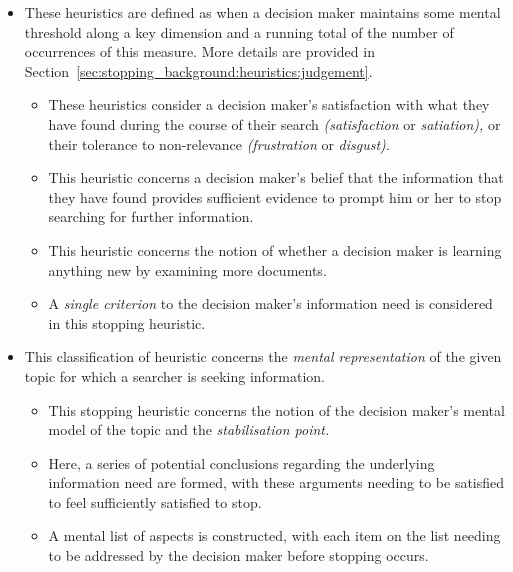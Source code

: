 \begin{itemize}
    \item{ These heuristics are defined as when a decision maker maintains some mental threshold along a key dimension and a running total of the number of occurrences of this measure. More details are provided in Section~\ref{sec:stopping_background:heuristics:judgement}.}
    \begin{itemize}
        \item{ These heuristics consider a decision maker's satisfaction with what they have found during the course of their search \emph{(satisfaction} or \emph{satiation),} or their tolerance to non-relevance \emph{(frustration} or \emph{disgust).}}
        \item{ This heuristic concerns a decision maker's belief that the information that they have found provides sufficient evidence to prompt him or her to stop searching for further information.}
        \item{ This heuristic concerns the notion of whether a decision maker is learning anything new by examining more documents.}
        \item{ A \emph{single criterion} to the decision maker's information need is considered in this stopping heuristic.}
    \end{itemize}
    
    \item{ This classification of heuristic concerns the \emph{mental representation} of the given topic for which a searcher is seeking information.}
    \begin{itemize}
        \item{ This stopping heuristic concerns the notion of the decision maker's mental model of the topic and the \emph{stabilisation point.}}
        \item{ Here, a series of potential conclusions regarding the underlying information need are formed, with these arguments needing to be satisfied to feel sufficiently satisfied to stop.}
        \item{ A mental list of aspects is constructed, with each item on the list needing to be addressed by the decision maker before stopping occurs.}
    \end{itemize}
\end{itemize}

